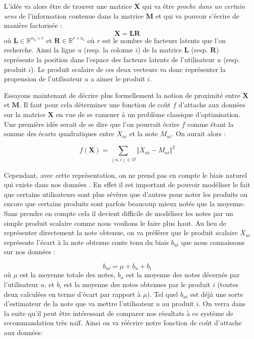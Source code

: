 \documentclass[10pt,a4paper]{article}
\begin{document}
L'idée va alors être de trouver une matrice $\textbf{X}$ qui va être \textit{proche dans un certain sens} de l'information contenue dans la matrice $\textbf{M}$ et qui va pouvoir s'écrire de manière factorisée :
$$ \textbf{X} = \mathbf{LR} $$
où $\mathbf{L} \in \mathbb{R}^{n_u\times r}$ et $\mathbf{R} \in \mathbb{R}^{r\times n_i}$ où $r$ est le nombre de facteurs latents que l'on recherche. Ainsi la ligne $u$ (resp. la colonne $i$) de la matrice $\mathbf{L}$ (resp. $\mathbf{R}$) représente la position dans l'espace des facteurs latents de l'utilisateur $u$ (resp. produit $i$). Le produit scalaire de ces deux vecteurs va donc représenter la propension de l'utilisateur $u$ a aimer le produit $i$. 

Essayons maintenant de décrire plus formellement la notion de proximité entre $\mathbf{X}$ et $\textbf{M}$. Il faut pour cela déterminer une fonction de coût $f$ d'attache aux données sur la matrice $\textbf{X}$ en vue de se ramener à un problème classique d'optimisation. Une première idée serait de se dire que l'on pourrait écrire $f$ comme étant la somme des écarts quadratiques entre $X_{ui}$ et la note $M_{ui}$. On aurait alors :

$$ f(\textbf{X}) = \sum_{(u,i)\in\Omega}\Vert X_{ui}-M_{ui} \Vert^2 $$

Cependant, avec cette représentation, on ne prend pas en compte le biais naturel qui existe dans nos données \cite{koren}. En effet il est important de pouvoir modéliser le fait que certains utilisateurs sont plus sévères que d'autres pour noter les produits ou encore que certains produits sont parfois beaucoup mieux notés que la moyenne. Sans prendre en compte cela il devient difficile de modéliser les notes par un simple produit scalaire comme nous voulions le faire plus haut. Au lieu de représenter directement la note obtenue, on va préférer que le produit scalaire $X_{ui}$ représente l'écart à la note obtenue conte tenu du biais $b_{ui}$ que nous connaissons sur nos données :

$$b_{ui} = \mu + b_u  + b_i $$ 
où $\mu$ est la moyenne totale des notes, $b_u$ est la moyenne des notes décernés par l'utilisateur $u$, et $b_i$ est la moyenne des notes obtenues par le produit $i$ (toutes deux calculées en terme d'écart par rapport à $\mu$). Tel quel $b_{ui}$ est déjà une sorte d'estimateur de la note que va mettre l'utilisateur $u$ au produit $i$. On verra dans la suite qu'il peut être intéressant de comparer nos résultats à ce système de recommandation très naïf. Ainsi on va réécrire notre fonction de coût d'attache aux données:
\end{document}
